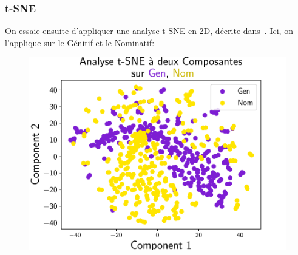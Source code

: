 \documentclass{cours}
\begin{document}
\subsubsection{t-SNE}\label{subsub:tsne}
On essaie ensuite d'appliquer une analyse t-SNE en 2D, décrite dans~\cite{tSNE}.
Ici, on l'applique sur le Génitif et le Nominatif:
\begin{figure}[H]

\begin{center}
\begin{minipage}{.5\textwidth}
	\begin{center}
	\includegraphics[width=\linewidth]{Figures/Visualisations/tsne_Gen_Nom.pdf}
	\end{center}
\end{minipage}
\end{center}


\end{figure}
\end{document}
